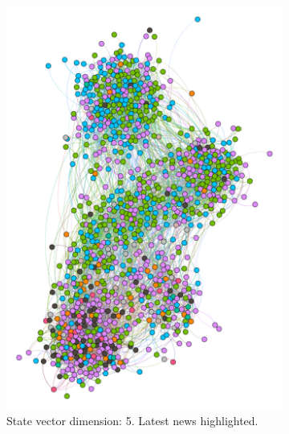 \begin{figure}
\begin{subfigure}[t]{0.25\textwidth}
    \label{fig:bubble3news}
  \end{subfigure}
  ~
  \begin{subfigure}[t]{0.35\textwidth}
    \includegraphics[width=\textwidth]{img/dim5_news.pdf}
    \caption{State vector dimension: 5.
      Latest news highlighted.}
    \label{fig:bubble5news}
  \end{subfigure}
  ~
  \begin{subfigure}[t]{0.35\textwidth}

\end{subfigure}
\end{figure}
